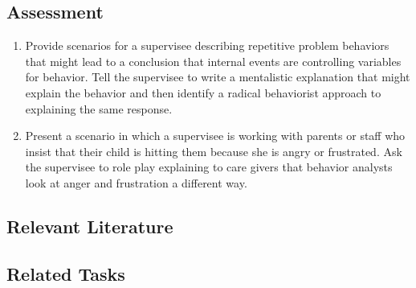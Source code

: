 \subsection{Assessment}
\begin{enumerate}
\item Provide scenarios for a supervisee describing repetitive problem behaviors that might lead to a conclusion that internal events are controlling variables for behavior. Tell the supervisee to write a mentalistic explanation that might explain the behavior and then identify a radical behaviorist approach to explaining the same response.
\item Present a scenario in which a supervisee is working with parents or staff who insist that their child is hitting them because she is angry or frustrated. Ask the supervisee to role play explaining to care givers that behavior analysts look at anger and frustration a different way. 
%
\end{enumerate}
%
\subsection{Relevant Literature}
\begin{refsection}
\nocite{test,alang2017police,clayton2018black}
\printbibliography[heading=none]
\end{refsection}
%
\subsection{Related Tasks}
\fourbOne{}\\
\fourgFour{}\\
\fourgFive{}\\
\fouriOne{}\\
\fouriTwo{}\\
\fourkTwo{}\\
\fourFKOne{}\\
\fourFKThree{}\\
\fourFKSeven{}\\
%
%
%
%
%
%
%
\section[\fourFKEight{}]{\fourFKEight{}%
              }
